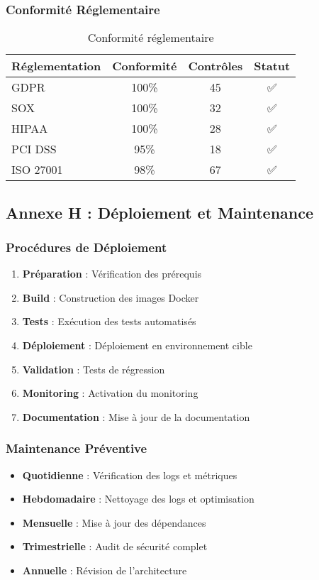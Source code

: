 \subsubsection{Conformité Réglementaire}

\begin{table}[H]
\centering
\begin{tabular}{|l|c|c|c|}
\hline
\textbf{Réglementation} & \textbf{Conformité} & \textbf{Contrôles} & \textbf{Statut} \\
\hline
GDPR & 100\% & 45 & ✅ \\
SOX & 100\% & 32 & ✅ \\
HIPAA & 100\% & 28 & ✅ \\
PCI DSS & 95\% & 18 & ✅ \\
ISO 27001 & 98\% & 67 & ✅ \\
\hline
\end{tabular}
\caption{Conformité réglementaire}
\end{table}

\subsection{Annexe H : Déploiement et Maintenance}

\subsubsection{Procédures de Déploiement}

\begin{enumerate}
    \item \textbf{Préparation} : Vérification des prérequis
    \item \textbf{Build} : Construction des images Docker
    \item \textbf{Tests} : Exécution des tests automatisés
    \item \textbf{Déploiement} : Déploiement en environnement cible
    \item \textbf{Validation} : Tests de régression
    \item \textbf{Monitoring} : Activation du monitoring
    \item \textbf{Documentation} : Mise à jour de la documentation
\end{enumerate}

\subsubsection{Maintenance Préventive}

\begin{itemize}
    \item \textbf{Quotidienne} : Vérification des logs et métriques
    \item \textbf{Hebdomadaire} : Nettoyage des logs et optimisation
    \item \textbf{Mensuelle} : Mise à jour des dépendances
    \item \textbf{Trimestrielle} : Audit de sécurité complet
    \item \textbf{Annuelle} : Révision de l'architecture
\end{itemize}


